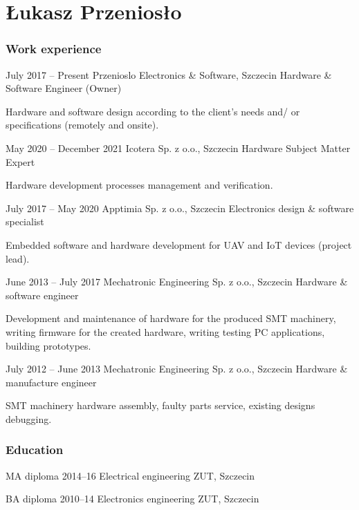 \documentclass{tccv}
\begin{document}
\part{Łukasz Przeniosło}

\section{Work experience}

\begin{eventlist}

\item{July 2017 -- Present}
     {Przenioslo Electronics \& Software, Szczecin}
     {Hardware \& Software Engineer (Owner)}
     
Hardware and software design according to the client's needs and/ or specifications (remotely and onsite).

\item{May 2020 -- December 2021}
     {Icotera Sp. z o.o., Szczecin}
     {Hardware Subject Matter Expert}
     
Hardware development processes management and verification.

\item{July 2017 -- May 2020}
     {Apptimia Sp. z o.o., Szczecin}
     {Electronics design \& software specialist}
     
Embedded software and hardware development for UAV and IoT devices (project lead).

\item{June 2013 -- July 2017}
     {Mechatronic Engineering Sp. z o.o., Szczecin}
     {Hardware \& software engineer}
     
Development and maintenance of hardware for the produced SMT machinery, writing firmware for the created hardware, writing testing PC applications, building prototypes. 

\item{July 2012 -- June 2013}
     {Mechatronic Engineering Sp. z o.o., Szczecin}
     {Hardware \& manufacture engineer}

SMT machinery hardware assembly, faulty parts service, existing designs debugging. 

\end{eventlist}

\section{Education}

\begin{yearlist}

\item[MA diploma]{2014--16}
     {Electrical engineering}
     {ZUT, Szczecin}

\item[BA diploma]{2010--14}
     {Electronics engineering}
     {ZUT, Szczecin}

\end{yearlist}
\end{document}
